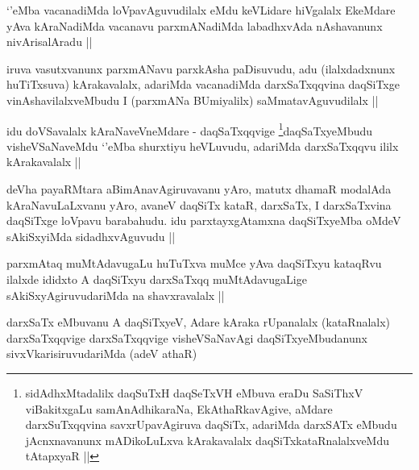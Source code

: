 \begin{artha}
`\stext'eMba vacanadiMda loVpavAguvudilalx eMdu keVLidare hiVgalalx EkeMdare yAva kAraNadiMda vacanavu parxmANadiMda labadhxvAda nAshavanunx nivArisalAradu ||
\end{artha}


\begin{artha}
iruva vasutxvanunx parxmANavu parxkAsha paDisuvudu, adu (ilalxdadxnunx huTiTxsuva) kArakavalalx, adariMda vacanadiMda darxSaTxqqvina daqSiTxge vinAshavilalxveMbudu I (parxmANa BUmiyalilx) saMmatavAguvudilalx ||
\end{artha}


\begin{artha}
idu doVSavalalx kAraNaveVneMdare - daqSaTxqqvige \footnote{sidAdhxMtadalilx daqSuTxH daqSeTxVH eMbuva eraDu SaSiThxV viBakitxgaLu samAnAdhikaraNa, EkAthaRkavAgive, aMdare darxSuTxqqvina savxrUpavAgiruva daqSiTx, adariMda darxSATx eMbudu jAcnxnavanunx mADikoLuLxva kArakavalalx daqSiTxkataRnalalxveMdu tAtapxyaR ||}daqSaTxyeMbudu visheVSaNaveMdu `\stext'eMba shurxtiyu heVLuvudu, adariMda darxSaTxqqvu ililx kArakavalalx ||
\end{artha}


\begin{artha}
deVha payaRMtara aBimAnavAgiruvavanu yAro, matutx dhamaR modalAda kAraNavuLaLxvanu yAro, avaneV daqSiTx kataR, darxSaTx, I darxSaTxvina daqSiTxge loVpavu barabahudu. idu parxtayxgAtamxna daqSiTxyeMba oMdeV sAkiSxyiMda sidadhxvAguvudu ||
\end{artha}


\begin{artha}
parxmAtaq muMtAdavugaLu huTuTxva muMce yAva daqSiTxyu kataqRvu ilalxde ididxto A daqSiTxyu darxSaTxqq muMtAdavugaLige sAkiSxyAgiruvudariMda na shavxravalalx ||
\end{artha}


\begin{artha}
darxSaTx eMbuvanu A daqSiTxyeV, Adare kAraka rUpanalalx (kataRnalalx) darxSaTxqqvige darxSaTxqqvige visheVSaNavAgi daqSiTxyeMbudanunx sivxVkarisiruvudariMda (adeV athaR)
\end{artha}

